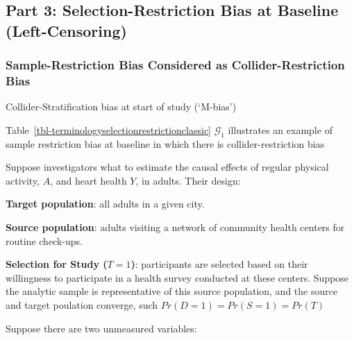 \documentclass[
  single column]{article}
\begin{document}
\newpage{}

\subsection{Part 3: Selection-Restriction Bias at Baseline
(Left-Censoring)}\label{part-3-selection-restriction-bias-at-baseline-left-censoring}

\subsubsection{Sample-Restriction Bias Considered as
Collider-Restriction
Bias}\label{sample-restriction-bias-considered-as-collider-restriction-bias}

\begin{table}

\caption{\label{tbl-terminologyselectionrestrictionclassic}Collider-Stratification
bias at start of study (`M-bias')}

\centering{

\terminologyselectionrestrictionclassic

}

\end{table}%

Table~\ref{tbl-terminologyselectionrestrictionclassic} \(\mathcal{G}_1\)
illustrates an example of sample restriction bias at baseline in which
there is collider-restriction bias

Suppose investigators what to estimate the causal effects of regular
physical activity, \(A\), and heart health \(Y\), in adults. Their
design:

\textbf{Target population}: all adults in a given city.

\textbf{Source population}: adults visiting a network of community
health centers for routine check-ups.

\textbf{Selection for Study (\(T = 1\))}: participants are selected
based on their willingness to participate in a health survey conducted
at these centers. Suppose the analytic sample is representative of this
source population, and the source and target poulation converge, such
\(Pr(D = 1) = Pr(S = 1) = Pr(T)\)

Suppose there are two unmeasured variables:
\end{document}
